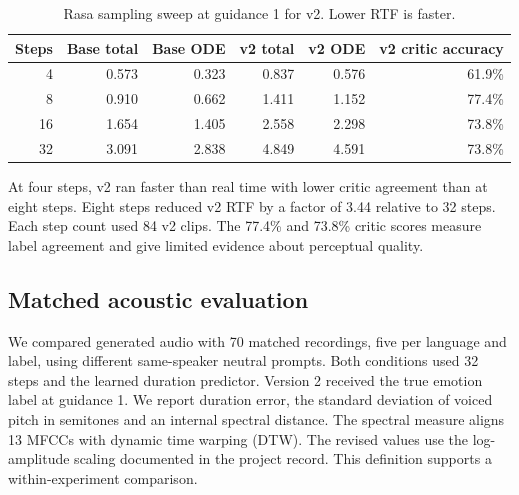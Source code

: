 \documentclass[11pt,a4paper]{article}
\begin{document}
\begin{table}[!h]
\centering
\caption{Rasa sampling sweep at guidance 1 for v2. Lower RTF is faster.}
\begin{tabular}{@{}rrrrrr@{}}
\toprule
Steps & Base total & Base ODE & v2 total & v2 ODE & v2 critic accuracy \\
\midrule
4  & 0.573 & 0.323 & 0.837 & 0.576 & 61.9\% \\
8  & 0.910 & 0.662 & 1.411 & 1.152 & 77.4\% \\
16 & 1.654 & 1.405 & 2.558 & 2.298 & 73.8\% \\
32 & 3.091 & 2.838 & 4.849 & 4.591 & 73.8\% \\
\bottomrule
\end{tabular}
\end{table}

At four steps, v2 ran faster than real time with lower critic agreement than at eight steps. Eight steps reduced v2 RTF by a factor of 3.44 relative to 32 steps. Each step count used 84 v2 clips. The 77.4\% and 73.8\% critic scores measure label agreement and give limited evidence about perceptual quality.

\subsection{Matched acoustic evaluation}
We compared generated audio with 70 matched recordings, five per language and label, using different same-speaker neutral prompts. Both conditions used 32 steps and the learned duration predictor. Version 2 received the true emotion label at guidance 1. We report duration error, the standard deviation of voiced pitch in semitones and an internal spectral distance. The spectral measure aligns 13 MFCCs with dynamic time warping (DTW). The revised values use the log-amplitude scaling documented in the project record. This definition supports a within-experiment comparison.
\end{document}
